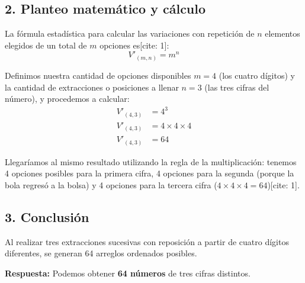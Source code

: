 \documentclass[12pt, a4paper]{article}
\begin{document}
\subsection*{2. Planteo matemático y cálculo}
La fórmula estadística para calcular las variaciones con repetición de $n$ elementos elegidos de un total de $m$ opciones es[cite: 1]:
\[ V'_{(m,n)} = m^n \]

Definimos nuestra cantidad de opciones disponibles $m = 4$ (los cuatro dígitos) y la cantidad de extracciones o posiciones a llenar $n = 3$ (las tres cifras del número), y procedemos a calcular:
\begin{align*}
V'_{(4,3)} &= 4^3 \\
V'_{(4,3)} &= 4 \times 4 \times 4 \\
V'_{(4,3)} &= 64
\end{align*}

Llegaríamos al mismo resultado utilizando la regla de la multiplicación: tenemos 4 opciones posibles para la primera cifra, 4 opciones para la segunda (porque la bola regresó a la bolsa) y 4 opciones para la tercera cifra ($4 \times 4 \times 4 = 64$)[cite: 1].

\subsection*{3. Conclusión}
Al realizar tres extracciones sucesivas con reposición a partir de cuatro dígitos diferentes, se generan 64 arreglos ordenados posibles.

\vspace{0.5cm}

\textbf{Respuesta:} Podemos obtener \textbf{64 números} de tres cifras distintos.
\end{document}
